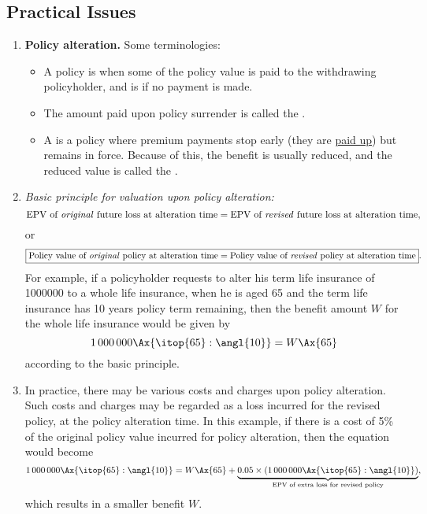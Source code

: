 \subsection{Practical Issues}
\label{subsect:practical-issues}
\begin{enumerate}
\item \textbf{Policy alteration.} Some terminologies:
\begin{itemize}
\item A policy is  when some of the policy value is paid to
the withdrawing policyholder, and is  if no payment is made.
\item The amount paid upon policy surrender is called the .
\item A  is a policy where premium payments stop early
(they are \underline{paid up}) but remains in force. Because of this, the
benefit is usually reduced, and the reduced value is called the .
\end{itemize}
\item \label{it:value-policy-alt} \emph{Basic principle for valuation upon
policy alteration:}
\[
\text{EPV of \emph{original} future loss at alteration time}
=\text{EPV of \emph{revised} future loss at alteration time},
\]
or
\[
\boxed{\text{Policy value of \emph{original} policy at alteration time}
=\text{Policy value of \emph{revised} policy at alteration time}}.
\]
For example, if a policyholder requests to alter his term life insurance of
\num{1000000} to a whole life insurance, when he is aged 65 and the term life
insurance has 10 years policy term remaining, then the benefit amount \(W\) for
the whole life insurance would be given by
\[
\num{1000000}\Ax{\itop{65}:\angl{10}}=W\Ax{65}
\]
according to the basic principle.

\item In practice, there may be various costs and charges upon policy
alteration. Such costs and charges may be regarded as a loss incurred for the
revised policy, at the policy alteration time. In this example, if there is a
cost of 5\% of the original policy value incurred for policy alteration, then
the equation would become
\[
\num{1000000}\Ax{\itop{65}:\angl{10}}=W\Ax{65}+\underbrace{0.05\times
\qty(\num{1000000}\Ax{\itop{65}:\angl{10}})}_{\mathclap{\text{EPV of extra loss for revised policy}}},
\]
which results in a smaller benefit \(W\).


\end{enumerate}

